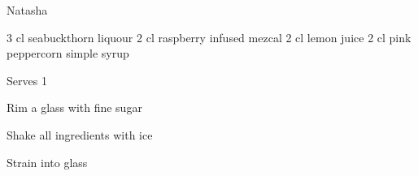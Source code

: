 
\begin{recipe}{Natasha}{}
\begin{ingredients}
3 cl seabuckthorn \ibreak liquour
2 cl raspberry infused mezcal
2 cl lemon juice
2 cl pink peppercorn simple syrup
\end{ingredients}
\nextcolumn
Serves 1
\begin{steps}
    \item Rim a glass with fine sugar
    \item Shake all ingredients with ice
    \item Strain into glass
\end{steps}
\end{recipe}